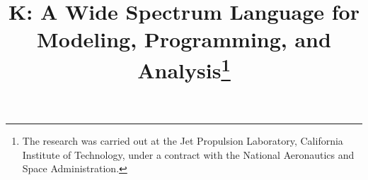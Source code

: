 \documentclass[a4paper, twoside]{article}
\begin{document}
\title{K: A Wide Spectrum Language for\\ Modeling, Programming, and Analysis\thanks{ 
The research was carried out at the Jet Propulsion
Laboratory, California Institute of Technology, under a contract
with the National Aeronautics and Space
Administration. 
}}

\author{ 
 }



\onecolumn \maketitle \normalsize \vfill















{\small }


%
\end{document}
